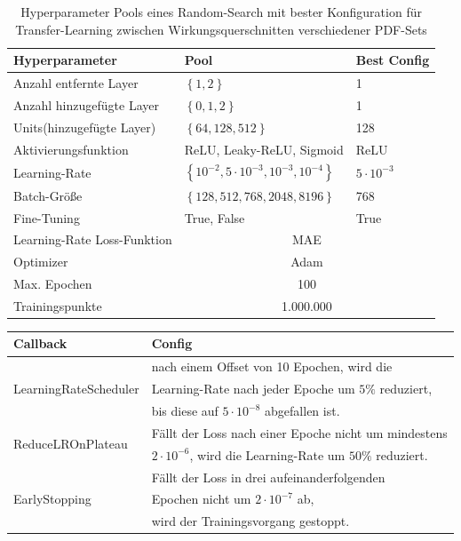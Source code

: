 \begin{table}
	\centering
	\begin{tabular}{|l|l|l|}
		\hline
		Hyperparameter & Pool & Best Config \\
		\hline
		Anzahl entfernte Layer & $\left\lbrace  1, 2 \right\rbrace $ & 1 \\
		Anzahl hinzugefügte Layer & $\left\lbrace  0, 1, 2 \right\rbrace $ & 1 \\
		Units(hinzugefügte Layer) &$\left\lbrace 64, 128, 512\right\rbrace$ & 128\\
		Aktivierungsfunktion & ReLU, Leaky-ReLU, Sigmoid & ReLU \\
		Learning-Rate & $\left\lbrace 10^{-2}, 5 \cdot 10^{-3}, 10^{-3}, 10^{-4} \right\rbrace $ & $5 \cdot 10^{-3}$\\
		Batch-Größe & $\left\lbrace 128, 512, 768, 2048, 8196 \right\rbrace $ & 768\\
		Fine-Tuning & True, False & True \\
		\hline
		Learning-Rate
		Loss-Funktion & \multicolumn{2}{c|}{MAE} \\
		Optimizer & \multicolumn{2}{c|}{Adam} \\
		Max. Epochen & \multicolumn{2}{c|}{100}\\
		Trainingspunkte & \multicolumn{2}{c|}{1.000.000} \\
		\hline
	\end{tabular}
	\caption{Hyperparameter Pools eines Random-Search mit bester Konfiguration für Transfer-Learning zwischen Wirkungsquerschnitten verschiedener PDF-Sets}
\end{table}
\begin{table}
	\centering
	\begin{tabular}{|l|l|}
		\hline
		Callback & Config \\
		\hline
		\multirow{3}{*}{LearningRateScheduler} & nach einem Offset von 10 Epochen, wird die \\
		& Learning-Rate nach jeder Epoche um $5\%$ reduziert, \\
		& bis diese auf $5 \cdot 10^{-8}$ abgefallen ist. \\
		\hline
		\multirow{2}{*}{ReduceLROnPlateau}& Fällt der Loss nach einer Epoche nicht um mindestens\\
		& $2 \cdot 10^{-6}$, wird die Learning-Rate um $50\%$ reduziert.\\
		\hline
		\multirow{3}{*}{EarlyStopping}& Fällt der Loss in drei aufeinanderfolgenden \\
		& Epochen nicht um $2 \cdot 10^{-7}$ ab, \\
		& wird der Trainingsvorgang gestoppt.\\
		\hline
	\end{tabular}
	\label{callbacks}
\end{table}
